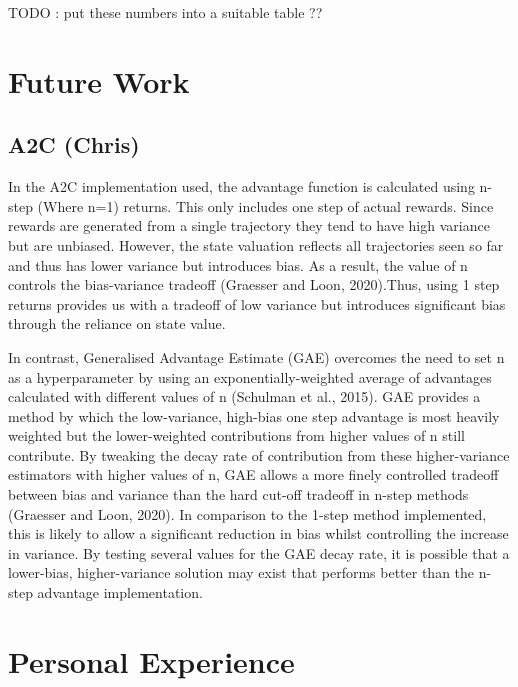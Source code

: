 \documentclass{article}
\begin{document}
TODO : put these numbers into a suitable table ??

\section{Future Work}


\subsection{A2C (Chris)}

In the A2C implementation used, the advantage function is calculated using n-step (Where n=1) returns. This only includes one step of actual rewards. Since rewards are generated from a single trajectory they tend to have high variance but are unbiased. However, the state valuation reflects all trajectories seen so far and thus has lower variance but introduces bias. As a result, the value of n controls the bias-variance tradeoff (Graesser and Loon, 2020).Thus, using 1 step returns provides us with a tradeoff of low variance but introduces significant bias through the reliance on state value.

In contrast, Generalised Advantage Estimate (GAE) overcomes the need to set n as a hyperparameter by using an exponentially-weighted average of advantages calculated with different values of n (Schulman et al., 2015). GAE provides a  method by which the low-variance, high-bias one step advantage is most heavily weighted but the lower-weighted contributions from higher values of n still contribute. By tweaking the decay rate of contribution from these higher-variance estimators with higher values of n, GAE allows a more finely controlled tradeoff between bias and variance than the hard cut-off tradeoff in n-step methods (Graesser and Loon, 2020). In comparison to the 1-step method implemented, this is likely to allow a significant reduction in bias whilst controlling the increase in variance. By testing several values for the GAE decay rate, it is possible that a lower-bias, higher-variance solution may exist that performs better than the n-step advantage implementation.

\section{Personal Experience}
\end{document}
